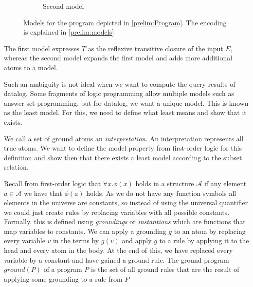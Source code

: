 \begin{contexample}
\begin{figure}
\begin{subfigure}{0.45\linewidth}
        \caption{Second model}
    \end{subfigure}
    \caption{Models for the program depicted in \cref{prelim:Program}. The encoding is explained in \cref{prelim:models}}

    \end{figure}
    
    The first model expresses $T$ as the reflexive transitive closure of the input $E$, whereas the second model expands the first model and adds more additional atoms to a model.
\end{contexample}

Such an ambiguity is not ideal when we want to compute the query results of datalog. Some fragments of logic programming allow multiple models such as answer-set programming, but for datalog, we want a unique model. This is known as the least model. For this, we need to define what least means and show that it exists.

We call a set of ground atoms an \textit{interpretation}. An interpretation represents all true atoms. We want to define the model property from first-order logic for this definition and show then that there exists a least model according to the subset relation.

Recall from first-order logic that $\forall x. \phi(x)$ holds in a structure $\mathcal{A}$ if any element $a \in \mathcal{A}$ we have that $\phi(a)$ holds. As we do not have any function symbols all elements in the universe are constants, so instead of using the universal quantifier we could just create rules by replacing variables with all possible constants.
Formally, this is defined using \textit{groundings} or \textit{instantions} which are functions that map variables to constants. We can apply a grounding $g$ to an atom by replacing every variable $v$ in the terms by $g(v)$ and apply $g$ to a rule by applying it to the head and every atom in the body. At the end of this, we have replaced every variable by a constant and have gained a ground rule. 
The ground program $ground(P)$ of a program $P$ is the set of all ground rules that are the result of applying some grounding to a rule from $P$

